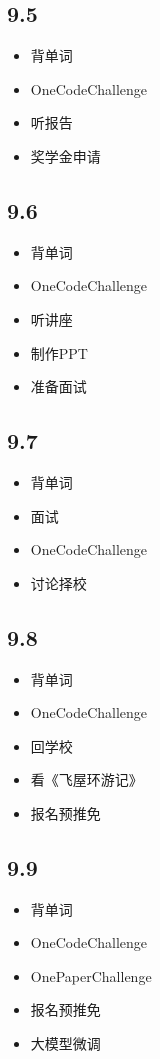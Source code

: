 \documentclass[UTF8]{ctexart}
\begin{document}
\subsection*{9.5}
\begin{itemize}
    \item 背单词
    \item OneCodeChallenge
    \item 听报告
    \item 奖学金申请
\end{itemize}

\subsection*{9.6}
\begin{itemize}
    \item 背单词
    \item OneCodeChallenge
    \item 听讲座
    \item 制作PPT
    \item 准备面试
\end{itemize}

\subsection*{9.7}
\begin{itemize}
    \item 背单词
    \item 面试
    \item OneCodeChallenge
    \item 讨论择校
\end{itemize}

\subsection*{9.8}
\begin{itemize}
    \item 背单词
    \item OneCodeChallenge
    \item 回学校
    \item 看《飞屋环游记》
    \item 报名预推免
\end{itemize}

\subsection*{9.9}
\begin{itemize}
    \item 背单词
    \item OneCodeChallenge
    \item OnePaperChallenge
    \item 报名预推免
    \item 大模型微调
\end{itemize}
\end{document}
